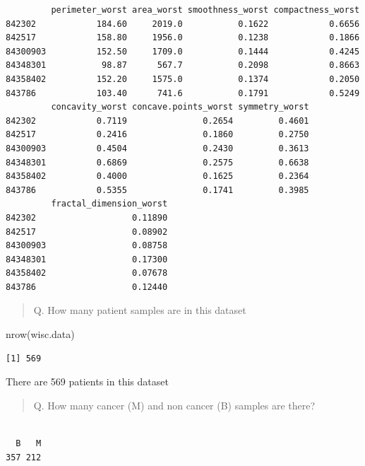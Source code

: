\documentclass[
  letterpaper,
  DIV=11,
  numbers=noendperiod]{scrartcl}
\newenvironment{Shaded}{\begin{snugshade}}{\end{snugshade}}
\newcommand{\FunctionTok}[1]{\textcolor[rgb]{0.28,0.35,0.67}{#1}}
\newcommand{\NormalTok}[1]{\textcolor[rgb]{0.00,0.23,0.31}{#1}}
\newcommand{\SpecialCharTok}[1]{\textcolor[rgb]{0.37,0.37,0.37}{#1}}
\begin{document}
\begin{verbatim}
         perimeter_worst area_worst smoothness_worst compactness_worst
842302            184.60     2019.0           0.1622            0.6656
842517            158.80     1956.0           0.1238            0.1866
84300903          152.50     1709.0           0.1444            0.4245
84348301           98.87      567.7           0.2098            0.8663
84358402          152.20     1575.0           0.1374            0.2050
843786            103.40      741.6           0.1791            0.5249
         concavity_worst concave.points_worst symmetry_worst
842302            0.7119               0.2654         0.4601
842517            0.2416               0.1860         0.2750
84300903          0.4504               0.2430         0.3613
84348301          0.6869               0.2575         0.6638
84358402          0.4000               0.1625         0.2364
843786            0.5355               0.1741         0.3985
         fractal_dimension_worst
842302                   0.11890
842517                   0.08902
84300903                 0.08758
84348301                 0.17300
84358402                 0.07678
843786                   0.12440
\end{verbatim}

\begin{quote}
Q. How many patient samples are in this dataset
\end{quote}

\begin{Shaded}
\begin{Highlighting}[]
\FunctionTok{nrow}\NormalTok{(wisc.data)}
\end{Highlighting}
\end{Shaded}

\begin{verbatim}
[1] 569
\end{verbatim}

There are 569 patients in this dataset

\begin{quote}
Q. How many cancer (M) and non cancer (B) samples are there?
\end{quote}

\begin{Shaded}
\end{Shaded}

\begin{verbatim}

  B   M 
357 212 
\end{verbatim}
\end{document}
